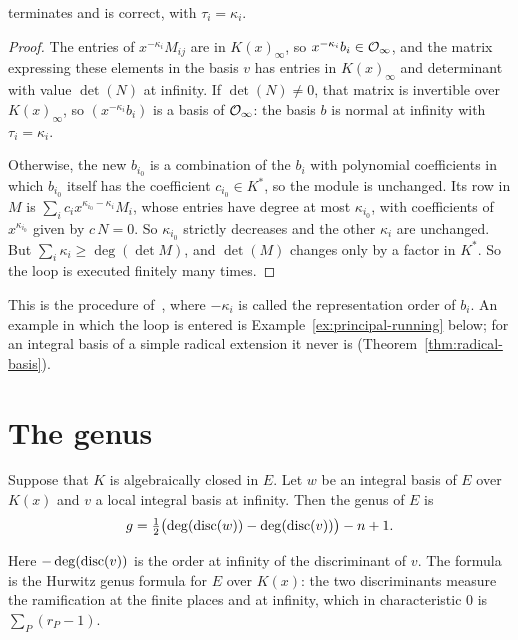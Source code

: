 \begin{proposition}\label{prop:normalize}
 terminates and is correct, with $\tau_i =
\kappa_i$.
\end{proposition}

\begin{proof}
The entries of $x^{-\kappa_i} M_{ij}$ are in $K(x)_\infty$, so $x^{-\kappa_i}
b_i \in \mathcal{O}_\infty$, and the matrix expressing these elements in the basis $v$
has entries in $K(x)_\infty$ and determinant with value $\det(N)$ at infinity.
If $\det(N) \ne 0$, that matrix is invertible over $K(x)_\infty$, so $(x^{-
\kappa_i} b_i)$ is a basis of $\mathcal{O}_\infty$: the basis $b$ is normal at
infinity with $\tau_i = \kappa_i$.

Otherwise, the new $b_{i_0}$ is a combination of the $b_i$ with polynomial
coefficients in which $b_{i_0}$ itself has the coefficient $c_{i_0} \in K^*$,
so the module is unchanged. Its row in $M$ is $\sum_i c_i x^{\kappa_{i_0} -
\kappa_i} M_i$, whose entries have degree at most $\kappa_{i_0}$, with
coefficients of $x^{\kappa_{i_0}}$ given by $c\,N = 0$. So $\kappa_{i_0}$
strictly decreases and the other $\kappa_i$ are unchanged. But $\sum_i
\kappa_i \ge \deg(\det M)$, and $\det(M)$ changes only by a factor in $K^*$.
So the loop is executed finitely many times.
\end{proof}

This is the procedure of~\cite[\S2.3]{trager1984}, where $-\kappa_i$ is
called the representation order of $b_i$. An example in which the loop is
entered is Example~\ref{ex:principal-running} below; for an integral basis
of a simple radical extension it never is
(Theorem~\ref{thm:radical-basis}).

\section{The genus}\label{sec:ib-genus}

\begin{theorem}\label{thm:genus}
Suppose that $K$ is algebraically closed in $E$. Let $w$ be an integral basis
of $E$ over $K(x)$ and $v$ a local integral basis at infinity. Then the genus
of $E$ is
\[
  g = \tfrac12 \bigl( \deg(\operatorname{disc}(w)) - \deg(\operatorname{disc}(v)) \bigr) - n + 1 .
\]
\end{theorem}

Here $-\deg(\operatorname{disc}(v))$ is the order at infinity of the discriminant of $v$.
The formula is the Hurwitz genus formula for $E$ over $K(x)$: the two
discriminants measure the ramification at the finite places and at
infinity, which in characteristic $0$ is $\sum_P (r_P - 1)$.

